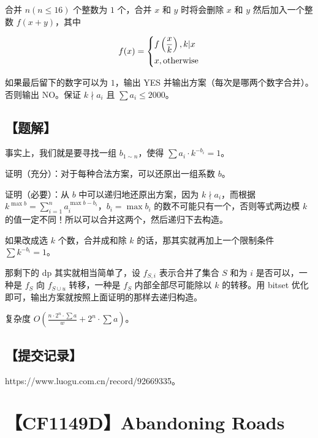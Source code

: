 \documentclass[UTF8,12pt,a4paper]{ctexart}
\begin{document}
	合并 $n(n\le 16)$ 个整数为 $1$ 个，合并 $x$ 和 $y$ 时将会删除 $x$ 和 $y$ 然后加入一个整数 $f(x+y)$，其中
	
	$$
	f(x)=\left\{ \begin{aligned} &f\left(\small \frac xk\right) , k|x \\&x,\text{otherwise} \end{aligned}\right.
	$$
	
	如果最后留下的数字可以为 $1$，输出 YES 并输出方案（每次是哪两个数字合并）。否则输出 NO。保证 $k \nmid a_i$ 且 $\sum a_i \le 2000$。
	
	\subsection*{【题解】}
	
	事实上，我们就是要寻找一组 $b_{1\sim n}$，使得 $\sum a_i\cdot k^{-b_i}=1$。
	
	证明（充分）：对于每种合法方案，可以还原出一组系数 $b$。
	
	证明（必要）：从 $b$ 中可以递归地还原出方案，因为 $k\nmid a_i$，而根据 $k^{\max b}=\sum_{i=1}^n a_i^{\max b - b_i}$，$b_i=\max b_i$ 的数不可能只有一个，否则等式两边模 $k$ 的值一定不同！所以可以合并这两个，然后递归下去构造。
	
	如果改成选 $k$ 个数，合并成和除 $k$ 的话，那其实就再加上一个限制条件 $\sum k^{-b_i}=1$。
	
	那剩下的 dp 其实就相当简单了，设 $f_{S, i}$ 表示合并了集合 $S$ 和为 $i$ 是否可以，一种是 $f_{S}$ 向 $f_{S\cup u}$ 转移，一种是 $f_S$ 内部全部尽可能除以 $k$ 的转移。用 bitset 优化即可，输出方案就按照上面证明的那样去递归构造。
	
	复杂度 $O\left(\frac{n\cdot 2^n\cdot \sum a}{w}+2^n\cdot \sum a \right)$。
	
	\subsection*{【提交记录】}
	
	https://www.luogu.com.cn/record/92669335。
	
	
	\section*{【CF1149D】Abandoning Roads}
	
\end{document}
